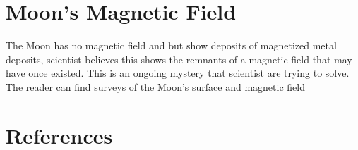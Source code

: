 \documentclass[12pt,oneside,a4paper,english]{article}
\begin{document}
\section{Moon's Magnetic Field}
The Moon has no magnetic field and but show deposits of magnetized metal deposits, scientist believes this shows the remnants of a magnetic field that may have once existed. This is an ongoing mystery that scientist are trying to solve.\cite{Moonfield} The reader can find surveys of the Moon's surface and magnetic field
\newpage
\section{References}


\end{document}
